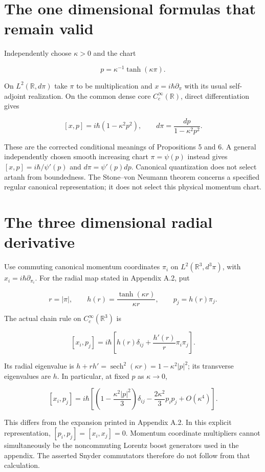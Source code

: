 \documentclass[
  11pt,
  a4paper,
]{article}
\begin{document}
\section{The one dimensional formulas that remain valid}\label{the-one-dimensional-formulas-that-remain-valid}

Independently choose \(\kappa>0\) and the chart

\[
p=\kappa^{-1}\tanh(\kappa\pi).
\]

On \(L^2(\mathbb R,d\pi)\) take \(\pi\) to be multiplication and \(x=i\hbar\partial_\pi\) with its usual self-adjoint realization. On the common dense core \(C_c^\infty(\mathbb R)\), direct differentiation gives

\[
[x,p]=i\hbar(1-\kappa^2p^2),\qquad
d\pi=\frac{dp}{1-\kappa^2p^2}.
\]

These are the corrected conditional meanings of Propositions 5 and 6. A general independently chosen smooth increasing chart \(\pi=\psi(p)\) instead gives \([x,p]=i\hbar/\psi'(p)\) and \(d\pi=\psi'(p)dp\). Canonical quantization does not select artanh from boundedness. The Stone--von Neumann theorem concerns a specified regular canonical representation; it does not select this physical momentum chart.

\section{The three dimensional radial derivative}\label{the-three-dimensional-radial-derivative}

Use commuting canonical momentum coordinates \(\pi_i\) on \(L^2(\mathbb R^3,d^3\pi)\), with \(x_i=i\hbar\partial_{\pi_i}\). For the radial map stated in Appendix A.2, put

\[
r=|\pi|,\qquad h(r)=\frac{\tanh(\kappa r)}{\kappa r},
\qquad p_j=h(r)\pi_j.
\]

The actual chain rule on \(C_c^\infty(\mathbb R^3)\) is

\[
[x_i,p_j]=i\hbar\left[h(r)\delta_{ij}
+\frac{h'(r)}r\pi_i\pi_j\right].
\]

Its radial eigenvalue is \(h+rh'=\operatorname{sech}^2(\kappa r)=1-\kappa^2|p|^2\); its transverse eigenvalues are \(h\). In particular, at fixed \(p\) as \(\kappa\to0\),

\[
[x_i,p_j]=i\hbar\left[
\left(1-\frac{\kappa^2|p|^2}{3}\right)\delta_{ij}
-\frac{2\kappa^2}{3}p_ip_j+O(\kappa^4)\right].
\]

This differs from the expansion printed in Appendix A.2. In this explicit representation, \([p_i,p_j]=[x_i,x_j]=0\). Momentum coordinate multipliers cannot simultaneously be the noncommuting Lorentz boost generators used in the appendix. The asserted Snyder commutators therefore do not follow from that calculation.
\end{document}
